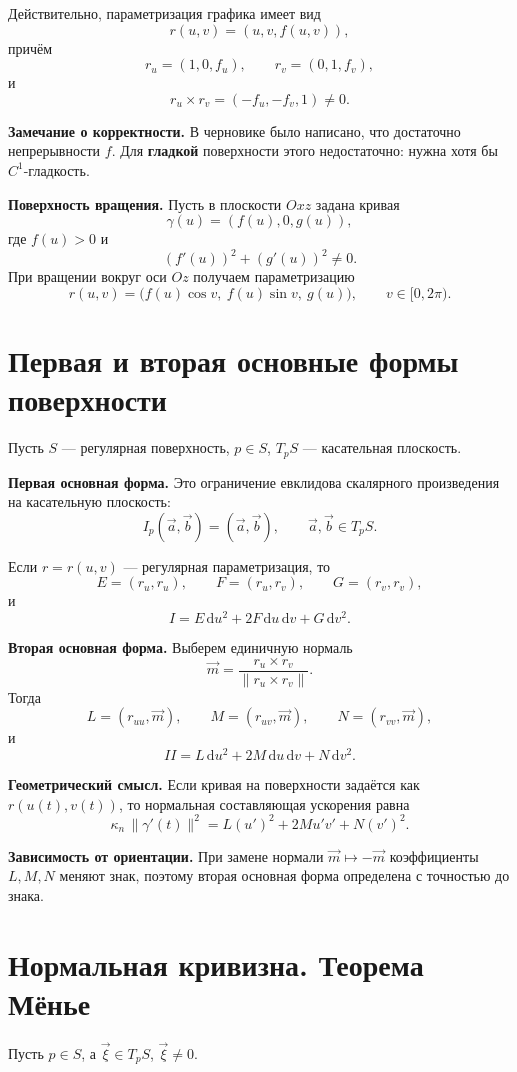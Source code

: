 \documentclass[12pt,a4paper]{article}
\newcommand{\dd}{\,\mathrm{d}}
\begin{document}
Действительно, параметризация графика имеет вид
\[
r(u,v)=(u,v,f(u,v)),
\]
причём
\[
r_u=(1,0,f_u),\qquad r_v=(0,1,f_v),
\]
и
\[
r_u\times r_v=(-f_u,-f_v,1)\neq 0.
\]

\textbf{Замечание о корректности.}
В черновике было написано, что достаточно непрерывности $f$.
Для \textbf{гладкой} поверхности этого недостаточно: нужна хотя бы $C^1$-гладкость.

\textbf{Поверхность вращения.}
Пусть в плоскости $Oxz$ задана кривая
\[
\gamma(u)=(f(u),0,g(u)),
\]
где $f(u)>0$ и
\[
(f'(u))^2+(g'(u))^2\neq 0.
\]
При вращении вокруг оси $Oz$ получаем параметризацию
\[
r(u,v)=\bigl(f(u)\cos v,\ f(u)\sin v,\ g(u)\bigr),
\qquad v\in [0,2\pi).
\]

\section{Первая и вторая основные формы поверхности}

Пусть $S$ --- регулярная поверхность, $p\in S$, $T_pS$ --- касательная плоскость.

\textbf{Первая основная форма.}
Это ограничение евклидова скалярного произведения на касательную плоскость:
\[
I_p(\vec{a},\vec{b})=(\vec{a},\vec{b}),\qquad \vec{a},\vec{b}\in T_pS.
\]

Если $r=r(u,v)$ --- регулярная параметризация, то
\[
E=(r_u,r_u),\qquad F=(r_u,r_v),\qquad G=(r_v,r_v),
\]
и
\[
I=E\dd u^2+2F\dd u\dd v+G\dd v^2.
\]

\textbf{Вторая основная форма.}
Выберем единичную нормаль
\[
\vec{m}=\frac{r_u\times r_v}{\|r_u\times r_v\|}.
\]
Тогда
\[
L=(r_{uu},\vec{m}),\qquad M=(r_{uv},\vec{m}),\qquad N=(r_{vv},\vec{m}),
\]
и
\[
II=L\dd u^2+2M\dd u\dd v+N\dd v^2.
\]

\textbf{Геометрический смысл.}
Если кривая на поверхности задаётся как $r(u(t),v(t))$, то нормальная
составляющая ускорения равна
\[
\kappa_n\,\|\gamma'(t)\|^2
=
L(u')^2+2Mu'v'+N(v')^2.
\]

\textbf{Зависимость от ориентации.}
При замене нормали $\vec{m}\mapsto -\vec{m}$ коэффициенты $L,M,N$ меняют знак,
поэтому вторая основная форма определена с точностью до знака.

\section{Нормальная кривизна. Теорема Мёнье}

Пусть $p\in S$, а $\vec{\xi}\in T_pS$, $\vec{\xi}\neq 0$.
\end{document}
